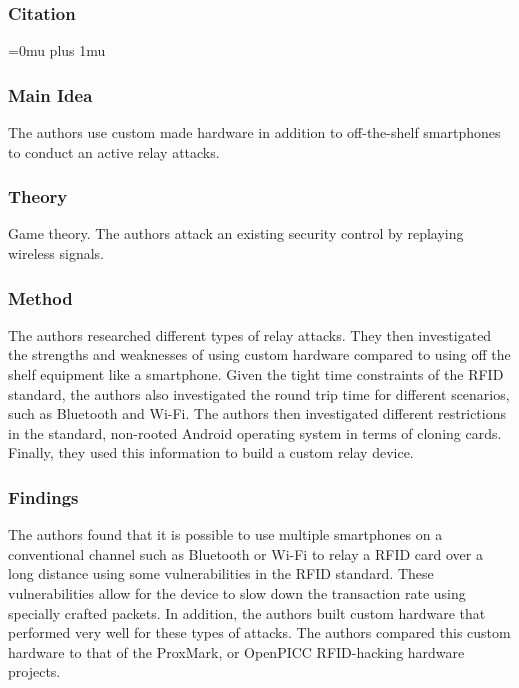 \noindent
\subsubsection{Citation}

\Urlmuskip=0mu plus 1mu\relax

\subsubsection{Main Idea}

\noindent
The authors use custom made hardware in addition to off-the-shelf smartphones to conduct an active relay attacks.

\subsubsection{Theory}

\noindent
Game theory.  The authors attack an existing security control by replaying wireless signals.

\subsubsection{Method}

\noindent
The authors researched different types of relay attacks.  They then investigated the strengths and weaknesses of using custom hardware compared to using off the shelf equipment like a smartphone.  Given the tight time constraints of the RFID standard, the authors also investigated the round trip time for different scenarios, such as Bluetooth and Wi-Fi.  The authors then investigated different restrictions in the standard, non-rooted Android operating system in terms of cloning cards.  Finally, they used this information to build a custom relay device.

\subsubsection{Findings}

\noindent
The authors found that it is possible to use multiple smartphones on a conventional channel such as Bluetooth or Wi-Fi to relay a RFID card over a long distance using some vulnerabilities in the RFID standard.  These vulnerabilities allow for the device to slow down the transaction rate using specially crafted packets. In addition, the authors built custom hardware that performed very well for these types of attacks.  The authors compared this custom hardware to that of the ProxMark, or OpenPICC RFID-hacking hardware projects.

